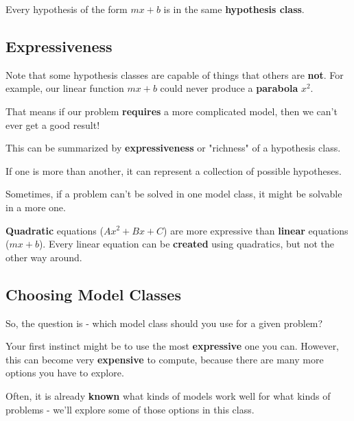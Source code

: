         
        \miniex Every hypothesis of the form $mx+b$ is in the same \textbf{hypothesis class}.
    
    \subsection{Expressiveness}
    
        Note that some hypothesis classes are capable of things that others are \textbf{not}. For example, our linear function $mx+b$ could never produce a \textbf{parabola} $x^2$.
        
        That means if our problem \textbf{requires} a more complicated model, then we can't ever get a good result!
        
        This can be summarized by \textbf{expressiveness} or "richness" of a hypothesis class.\\
        
        \begin{definition}
            If one  is more  than another, it can represent a  collection of possible hypotheses.
            
            Sometimes, if a problem can't be solved in one model class, it might be solvable in a more  one.
        \end{definition}
        
        \miniex \textbf{Quadratic} equations ($Ax^2+Bx+C$) are more expressive than \textbf{linear} equations ($mx+b$). Every linear equation can be \textbf{created} using quadratics, but not the other way around.
        
    \subsection{Choosing Model Classes}
    
        So, the question is - which model class should you use for a given problem?
        
        Your first instinct might be to use the most \textbf{expressive} one you can. However, this can become very \textbf{expensive} to compute, because there are many more options you have to explore.
        
        Often, it is already \textbf{known} what kinds of models work well for what kinds of problems - we'll explore some of those options in this class.
        
